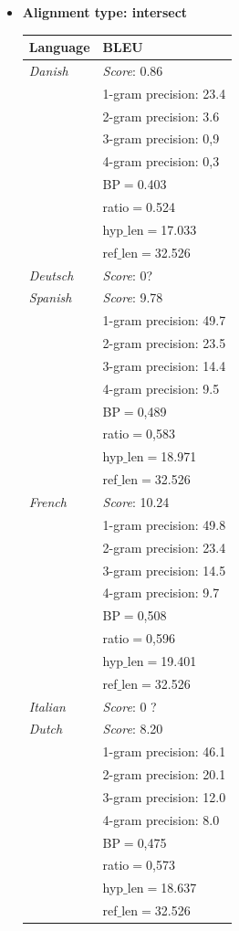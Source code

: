 \documentclass[11pt]{article}
\begin{document}
\begin{itemize}
\newpage
\item \textbf{Alignment type: intersect}

\begin{center}
    \begin{tabular}{ | l | l |}
    \hline
    \textbf{Language} & \textbf{BLEU} \\ 
    \hline
    \textit{Danish} & \textit{Score}: 0.86 \\
    & 1-gram precision: 23.4 \\
    & 2-gram precision: 3.6 \\
    & 3-gram precision: 0,9 \\
    & 4-gram precision: 0,3 \\
    & BP$=$0.403 \\
    & ratio$=$0.524 \\
    & hyp$\_$len$=$17.033 \\
    & ref$\_$len$=$32.526\\
    \hline
    \textit{Deutsch} & \textit{Score}: 0? \\
    \hline
    \textit{Spanish} & \textit{Score}: 9.78 \\
    & 1-gram precision: 49.7 \\
    & 2-gram precision: 23.5 \\
    & 3-gram precision: 14.4 \\
    & 4-gram precision: 9.5 \\
    & BP$=$0,489 \\
    & ratio$=$0,583 \\
    & hyp$\_$len$=$18.971 \\
    & ref$\_$len$=$32.526\\
    \hline
    \textit{French} & \textit{Score}: 10.24 \\
    & 1-gram precision: 49.8 \\
    & 2-gram precision: 23.4 \\
    & 3-gram precision: 14.5 \\
    & 4-gram precision: 9.7 \\
    & BP$=$0,508 \\
    & ratio$=$0,596 \\
    & hyp$\_$len$=$19.401 \\
    & ref$\_$len$=$32.526\\
    \hline %
    \textit{Italian} & \textit{Score}: 0 ? \\
    \hline
    \textit{Dutch} & \textit{Score}: 8.20 \\
    & 1-gram precision: 46.1 \\
    & 2-gram precision: 20.1 \\
    & 3-gram precision: 12.0 \\
    & 4-gram precision: 8.0 \\
    & BP$=$0,475 \\
    & ratio$=$0,573 \\
    & hyp$\_$len$=$18.637 \\
    & ref$\_$len$=$32.526\\
    \hline
    \end{tabular}
    

\end{center}
\end{itemize}
\end{document}
